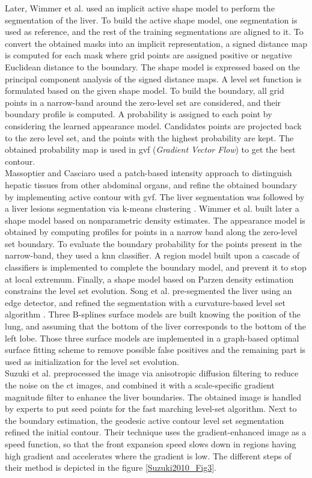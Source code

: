 Later, Wimmer et al. \cite{Wimmer2008} used an implicit active shape model to perform the
segmentation of the liver. To build the active shape model, one
segmentation is used as reference, and the rest of the training
segmentations are aligned to it. To convert the obtained masks into an
implicit representation, a signed distance map is computed for each mask
where grid points are assigned positive or negative Euclidean distance
to the boundary. The shape model is expressed based on the principal
component analysis of the signed distance maps. A level set function is
formulated based on the given shape model. To build the boundary, all
grid points in a narrow-band around the zero-level set are considered,
and their boundary profile is computed. A probability is assigned to
each point by considering the learned appearance model. Candidates
points are projected back to the zero level set, and the points with the
highest probability are kept. The obtained probability map is used in
\ac{gvf} (\emph{Gradient Vector Flow}) to get the best contour.\\
Massoptier and Casciaro used a patch-based intensity approach to distinguish
hepatic tissues from other abdominal organs, and refine the obtained
boundary by implementing active contour with \ac{gvf}. The liver segmentation
was followed by a liver lesions segmentation via k-means clustering \cite{Massoptier2008}. Wimmer et al. \cite{Wimmer2009} built later a shape model based on nonparametric density
estimates. The appearance model is obtained by computing profiles for
points in a narrow band along the zero-level set boundary. To evaluate
the boundary probability for the points present in the narrow-band, they
used a \ac{knn} classifier. A region model built upon a cascade of
classifiers is implemented to complete the boundary model, and prevent
it to stop at local extremum. Finally, a shape model based on Parzen
density estimation constrains the level set evolution. Song et al. \cite{Song2009} pre-segmented the liver using an edge detector, and
refined the segmentation with a curvature-based level set algorithm .
Three B-splines surface models are built knowing the position of the
lung, and assuming that the bottom of the liver corresponds to the
bottom of the left lobe. Those three surface models are implemented in a
graph-based optimal surface fitting scheme to remove possible false
positives and the remaining part is used as initialization for the level
set evolution.\\
Suzuki et al. \cite{Suzuki2010} preprocessed the image via anisotropic diffusion
filtering to reduce the noise on the \ac{ct} images, and combined it with a
scale-specific gradient magnitude filter to enhance the liver
boundaries. The obtained image is handled by experts to put seed points
for the fast marching level-set algorithm. Next to the boundary
estimation, the geodesic active contour level set segmentation refined
the initial contour. Their technique uses the gradient-enhanced image as
a speed function, so that the front expansion speed slows down in
regions having high gradient and accelerates where the gradient is low.
The different steps of their method is depicted in the figure \ref{Suzuki2010_Fig3}.

